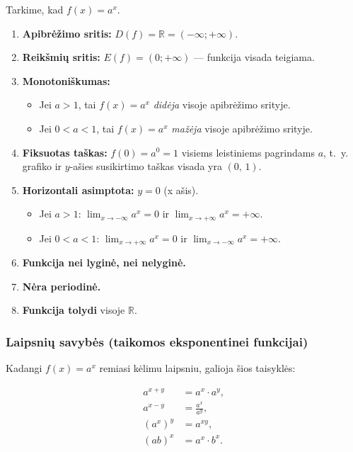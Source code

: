 Tarkime, kad $f(x) = a^x$.

\begin{enumerate}[label=\arabic*.]
    \item \textbf{Apibrėžimo sritis:} $D(f) = \mathbb{R} = (-\infty; +\infty)$.
    \item \textbf{Reikšmių sritis:} $E(f) = (0; +\infty)$ --- funkcija visada
          teigiama.
    \item \textbf{Monotoniškumas:}
        \begin{itemize}
            \item Jei $a > 1$, tai $f(x) = a^x$ \textit{didėja} visoje
                  apibrėžimo srityje.
            \item Jei $0 < a < 1$, tai $f(x) = a^x$ \textit{mažėja} visoje
                  apibrėžimo srityje.
        \end{itemize}
    \item \textbf{Fiksuotas taškas:} $f(0) = a^0 = 1$ visiems leistiniems
          pagrindams $a$, t.~y. grafiko ir $y$\nobreakdash-ašies susikirtimo
          taškas visada yra $(0,\,1)$.
    \item \textbf{Horizontali asimptota:} $y = 0$ (x ašis).
        \begin{itemize}
            \item Jei $a > 1$: $\lim_{x \to -\infty} a^x = 0$ ir
                  $\lim_{x \to +\infty} a^x = +\infty$.
            \item Jei $0 < a < 1$: $\lim_{x \to +\infty} a^x = 0$ ir
                  $\lim_{x \to -\infty} a^x = +\infty$.
        \end{itemize}
    \item \textbf{Funkcija nei lyginė, nei nelyginė.}
    \item \textbf{Nėra periodinė.}
    \item \textbf{Funkcija tolydi} visoje $\mathbb{R}$.
\end{enumerate}

\subsubsection*{Laipsnių savybės (taikomos eksponentinei funkcijai)}

Kadangi $f(x) = a^x$ remiasi kėlimu laipsniu, galioja šios taisyklės:

\begin{align}
    a^{x+y} &= a^x \cdot a^y, \\
    a^{x-y} &= \frac{a^x}{a^y}, \\
    \left(a^x\right)^y &= a^{xy}, \\
    (ab)^x &= a^x \cdot b^x.
\end{align}

